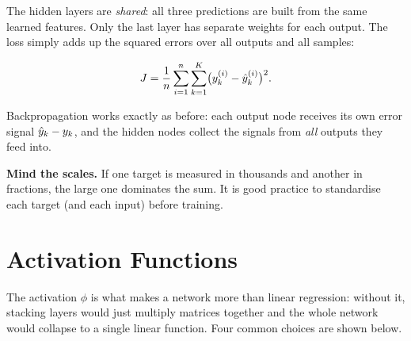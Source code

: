 \documentclass[12pt, a4paper]{article}
\begin{document}
The hidden layers are \emph{shared}: all three predictions are built from the
same learned features. Only the last layer has separate weights for each
output. The loss simply adds up the squared errors over all outputs and all
samples:
\begin{resultbox}
  \[
    J = \frac{1}{n} \sum_{i=1}^{n} \sum_{k=1}^{K}
    \bigl(y^{(i)}_k - \hat{y}^{(i)}_k\bigr)^2 .
  \]
\end{resultbox}
Backpropagation works exactly as before: each output node receives its own
error signal $\hat{y}_k - y_k$, and the hidden nodes collect the signals from
\emph{all} outputs they feed into.

\begin{notebox}
  \textbf{Mind the scales.} If one target is measured in thousands and
  another in fractions, the large one dominates the sum. It is good practice
  to standardise each target (and each input) before training.
\end{notebox}

\section{Activation Functions}
\label{sec:activation}

The activation $\phi$ is what makes a network more than linear regression:
without it, stacking layers would just multiply matrices together and the
whole network would collapse to a single linear function. Four common choices
are shown below.

\newcommand{\actaxes}[4]{%
  \draw[gray!40, ->] (#1,0) -- (#2+0.3,0) node[right, font=\scriptsize, gray] {$z$};
  \draw[gray!40, ->] (0,#3) -- (0,#4+0.3);
}
\end{document}

